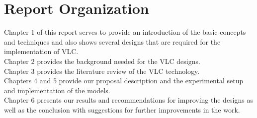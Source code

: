 
\section{Report Organization}

Chapter 1 of this report serves to provide an introduction of the basic concepts and techniques and also shows several designs that are required for the implementation of VLC.  \\
Chapter 2 provides the background needed for the VLC designs. \\ 
Chapter 3 provides the literature review of the VLC technology. \\ 
Chapters 4 and 5 provide our proposal description and the experimental setup and implementation of the models. \\
Chapter 6 presents our results and recommendations for improving the designs as well as the conclusion with suggestions for further improvements in the work.
